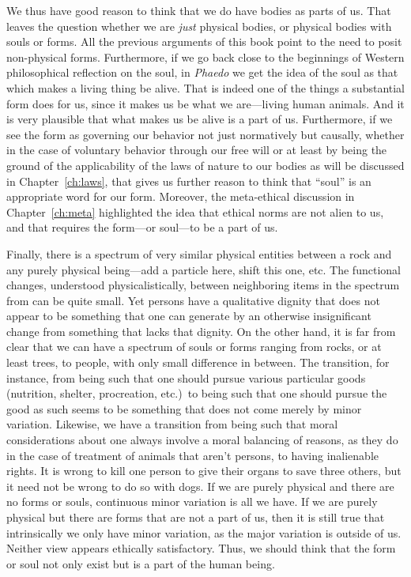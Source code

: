 We thus have good reason to think that we do have bodies as parts of us. That leaves the question whether
we are \textit{just} physical bodies, or physical bodies with souls or forms. All the previous arguments of this
book point to the need to posit non-physical forms. Furthermore, if we go back close to the beginnings of Western philosophical
reflection on the soul, in  \textit{Phaedo} we get the idea of the soul as that which makes a
living thing be alive. That is indeed one of the things a substantial form does for us, since it makes us be
what we are---living human animals. And it is very plausible that what makes us be alive is a part of us. 
Furthermore, if we see the form as governing our behavior not just normatively
but causally, whether in the case of voluntary behavior through our free will or at least by being the ground of
the applicability of the laws of nature to our bodies as will be discussed in Chapter~\ref{ch:laws}, that gives us further
reason to think that ``soul'' is an appropriate word for our form. Moreover, the meta-ethical discussion in Chapter~\ref{ch:meta}
highlighted the idea that ethical norms are not alien to us, and that requires the form---or soul---to be a 
part of us. 

Finally, there is a spectrum of very similar physical entities between a rock and any 
purely physical being---add a particle here, shift this one, etc. The functional changes, understood 
physicalistically, between neighboring items in the spectrum from can be quite small. Yet persons have 
a qualitative dignity that does not appear to be something that one can generate by an otherwise 
insignificant change from something that lacks that dignity. On the other hand, it is far from clear that 
we can have a spectrum of souls or forms ranging from rocks, or at least trees, to people, with only 
small difference in between. The transition, for instance, from being such that one should pursue various
particular goods (nutrition, shelter, procreation, etc.)\ to being such that one should pursue the good as 
such seems to be something that does not come merely by minor variation. Likewise, we have a transition from 
being such that moral considerations about one always involve a moral balancing of reasons, as they do in
the case of treatment of animals that aren't persons, to having inalienable rights. It is wrong to kill one
person to give their organs to save three others, but it need not be wrong to do so with dogs. 
 If we are purely physical and 
there are no forms or souls, continuous minor variation is all we have. If we are purely physical but there are
forms that are not a part of us, then it is still true that intrinsically we only have minor variation, 
as the major variation is outside of us. Neither view appears ethically satisfactory. Thus, we should think that the form or soul not only exist
but is a part of the human being.



